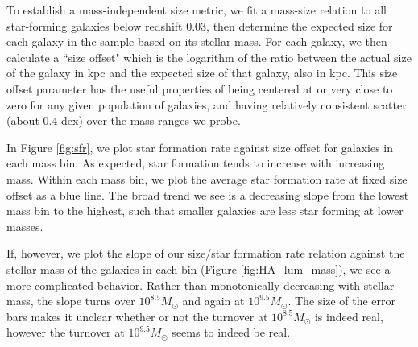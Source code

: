 \documentclass[iop]{emulateapj}
\begin{document}
To establish a mass-independent size metric, we fit a mass-size relation to all star-forming galaxies below redshift 0.03, then determine the expected size for each galaxy in the sample based on its stellar mass. For each galaxy, we then calculate a ``size offset" which is the logarithm of the ratio between the actual size of the galaxy in kpc and the expected size of that galaxy, also in kpc. This size offset parameter has the useful properties of being centered at or very close to zero for any given population of galaxies, and having relatively consistent scatter (about 0.4 dex) over the mass ranges we probe.


In Figure \ref{fig:sfr}, we plot star formation rate against size offset for galaxies in each mass bin. As expected, star formation tends to increase with increasing mass. Within each mass bin, we plot the average star formation rate at fixed size offset as a blue line. The broad trend we see is a decreasing slope from the lowest mass bin to the highest, such that smaller galaxies are less star forming at lower masses. 

If, however, we plot the slope of our size/star formation rate relation against the stellar mass of the galaxies in each bin (Figure \ref{fig:HA_lum_mass}), we see a more complicated behavior. Rather than monotonically decreasing with stellar mass, the slope turns over $10^{8.5} M_{\odot}$  and again at $10^{9.5} M_{\odot}$. The size of the error bars makes it unclear whether or not the turnover at $10^{8.5} M_{\odot}$ is indeed real, however the turnover at $10^{9.5} M_{\odot}$ seems to indeed be real.
\end{document}
